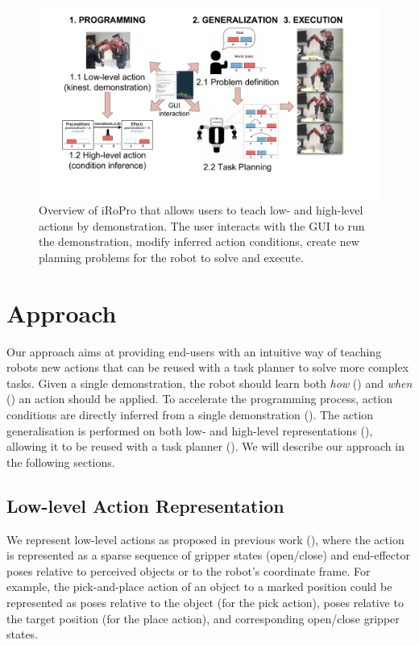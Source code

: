 
  \begin{figure}[t]
   \centering
\includegraphics[width=0.7\linewidth]{figures/overview.pdf}
   \caption{Overview of iRoPro that allows users to teach low- and high-level actions by demonstration. The user interacts with the GUI to run the demonstration, modify inferred action conditions, create new planning problems for the robot to solve and execute.}
   \label{fig:overview}
  \end{figure}	
  \section{Approach}
\label{sec:approach}
Our approach aims at providing end-users with an intuitive way of teaching robots new actions that can be reused with a task planner to solve more complex tasks.
Given a single demonstration, the robot should learn both \textit{how} () and \textit{when} () an action should be applied.
To accelerate the programming process, action conditions are directly inferred from a single demonstration ().
The action generalisation is performed on both low- and high-level representations (), allowing it to be reused with a task planner ().
We will describe our approach in the following sections.

\subsection{Low-level Action Representation}
\label{sec:lowlevel}
We represent low-level actions as proposed in previous work (\cite{akgun2012keyframe,alexandrova2014robot}), where the action is represented as a sparse sequence of gripper states (open/close) and end-effector poses relative to perceived objects or to the robot's coordinate frame.
For example, the pick-and-place action of an object to a marked position could be represented as poses relative to the object (for the pick action), poses relative to the target position (for the place action), and corresponding open/close gripper states. 


